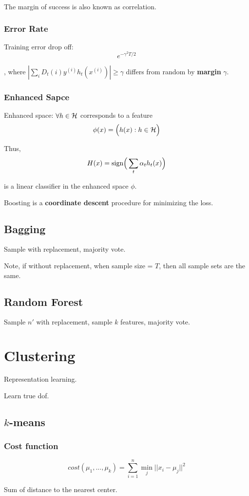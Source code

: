 \documentclass[a4paper]{report}
\begin{document}
The margin of success is also known as correlation. 
\subsection{Error Rate}
Training error drop off:
$$
e^{-\gamma^2T/2}
$$

, where $|\sum_i D_t(i)y^{(i)}h_t(x^{(i)})|\geq \gamma$ differs from random by \textbf{margin} $\gamma$.

\subsection{Enhanced Sapce}
Enhanced space: $\forall h \in \mathcal{H}$ corresponds to a feature 
$$
\phi(x) = \Big(h(x):h\in \mathcal{H}\Big)
$$

Thus, 
$$
H(x) = \text{sign}\Big(\sum_t \alpha_t h_t(x)\Big)
$$

is a linear classifier in the enhanced space $\phi$. 

Boosting is a \textbf{coordinate descent} procedure for minimizing the loss.

\section{Bagging}
Sample with replacement, majority vote. 

Note, if without replacement, when sample size = $T$, then all sample sets are the same. 

\section{Random Forest}
Sample $n'$ with replacement, sample $k$ features, majority vote.

\chapter{Clustering}
Representation learning. 

Learn true dof. 

\section{$k$-means}
\subsection{Cost function}
$$
cost(\mu_1, ..., \mu_k) = \sum_{i=1}^n \min_j ||x_i-\mu_j||^2
$$

Sum of distance to the nearest center. 
\end{document}
